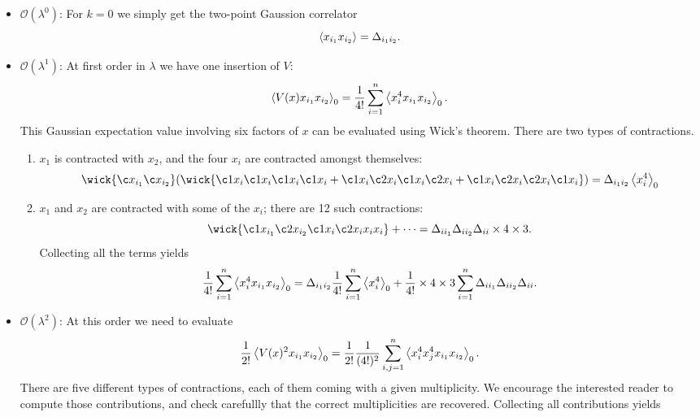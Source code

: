 \documentclass{article}
\numberwithin{equation}{section}
\begin{document}
\begin{itemize}
    \item $\mathcal{O}(\lambda^0)$: For $k=0$ we simply get the two-point Gaussion correlator
    \begin{equation}
        \ev{x_{i_1}x_{i_2}} = \Delta_{i_1 i_2}.
    \end{equation}
    \item $\mathcal{O}(\lambda^1)$: At first order in $\lambda$ we have one insertion of $V$:
    \begin{equation}
        \ev{V(x)x_{i_1} x_{i_2}}_0 = \frac{1}{4!} \sum_{i = 1}^n \ev{x_i^4 x_{i_1} x_{i_2}}_0.
    \end{equation}
    This Gaussian expectation value involving six factors of $x$ can be evaluated using Wick's theorem. There are two types of contractions.
    \begin{enumerate}
        \item $x_1$ is contracted with $x_2$, and the four $x_i$ are contracted amongst themselves:
        \begin{equation}
            \wick{\c x_{i_1} \c x_{i_2}}(\wick{\c1 x_i \c1 x_i \c1 x_i \c1 x_i + \c1 x_i \c2 x_i \c1 x_i \c2 x_i + \c1 x_i \c2 x_i \c2 x_i \c1 x_i}) = \Delta_{i_1 i_2} \ev{x_i^4}_0
        \end{equation}
        \item $x_1$ and $x_2$ are contracted with some of the $x_i$; there are 12 such contractions:
        \begin{equation}
            \wick{\c1 x_{i_1} \c2 x_{i_2} \c1 x_i \c2 x_i x_i x_i} + \cdots = \Delta_{i i_1} \Delta_{i i_2} \Delta_{ii} \times 4 \times 3.
        \end{equation}
        Collecting all the terms yields
        \begin{equation}
            \frac{1}{4!} \sum_{i = 1}^n \ev{x_i^4 x_{i_1} x_{i_2}}_0 = \Delta_{i_1 i_2} \frac{1}{4!} \sum_{i = 1}^n \ev{x_i^4}_0 + \frac{1}{4!} \times 4 \times 3 \sum_{i=1}^n \Delta_{i i_1} \Delta_{i i_2} \Delta_{ii}.
        \end{equation}
    \end{enumerate}
    \item $\mathcal{O}(\lambda^2)$: At this order we need to evaluate
    \begin{equation}
        \frac{1}{2!}\ev{V(x)^2 x_{i_1} x_{i_2}}_0 = \frac{1}{2!} \frac{1}{(4!)^2} \sum_{i,j=1}^n \ev{x_i^4 x_j^4 x_{i_1} x_{i_2}}_0.
    \end{equation}
    There are five different types of contractions, each of them coming with a given multiplicity. We encourage the interested reader to compute those contributions, and check carefullly that the correct multiplicities are recovered. Collecting all contributions yields

\end{itemize}
\end{document}
